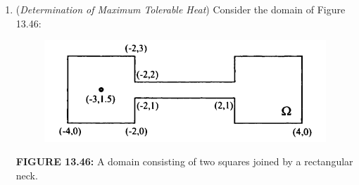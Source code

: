 \documentclass[../main.tex]{subfiles}
\begin{document}
\begin{enumerate}
	\item (\textit{Determination of Maximum Tolerable Heat}) Consider the domain of Figure 13.46: 
	\begin{figure}[H]
\includegraphics[width=0.9\linewidth]{33}
	\centering
	\label{pfig:ch13_33}
\end{figure}
\textbf{FIGURE 13.46:} A domain consisting of two squares joined by a rectangular neck.
\\
\\


\end{enumerate}
\end{document}
